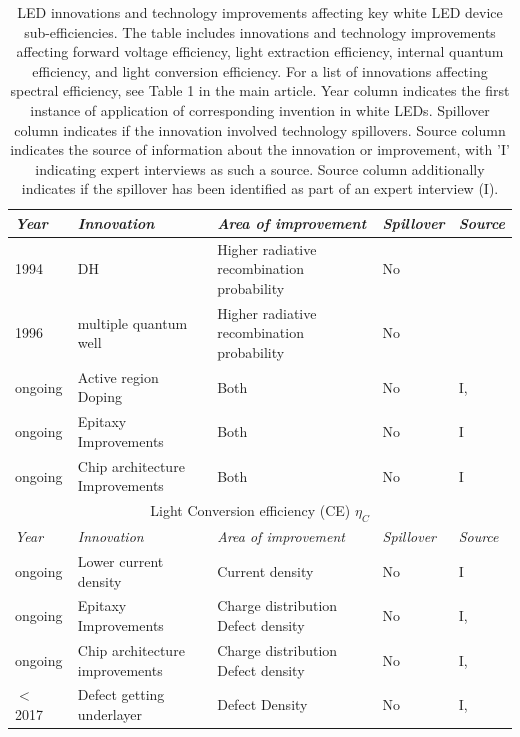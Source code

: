 \documentclass[10pt]{article}
\begin{document}
\begin{table}[H]
\begin{tabularx}{\textwidth}{ |l|X|X|l|l| }
        \hline
            \textit{Year} & \textit{Innovation} & \textit{Area of improvement} & \textit{Spillover} & \textit{Source} \\
        \hline
            1994 & DH & Higher radiative recombination probability & No & \cite{Nakamura1994} \\
        \hline
            1996 & multiple quantum well & Higher radiative recombination probability & No & \cite{Koike1996} \\
        \hline
            ongoing & Active region \newline Doping & Both & No & I, \cite{schubert2018light} \\
        \hline
            ongoing & Epitaxy \newline Improvements & Both & No & I \\
        \hline
            ongoing & Chip architecture \newline Improvements & Both & No & I \\
        \hline
        \multicolumn{5}{c}{Light Conversion efficiency (CE) $\eta_{C}$} \\
        \hline
            \textit{Year} & \textit{Innovation} & \textit{Area of improvement} & \textit{Spillover} & \textit{Source} \\
        \hline
            ongoing & Lower current density & Current density & No & I \\
        \hline
            ongoing & Epitaxy \newline Improvements & Charge distribution \newline Defect density & No & I, \cite{bhardwaj2016progress} \\
        \hline
            ongoing & Chip architecture \newline improvements  & Charge distribution \newline Defect density & No & I, \cite{Wildeson2017} \\
        \hline
            $<$ 2017 & Defect getting \newline underlayer & Defect Density & No & I, \cite{haller2017burying} \\
        \hline
        \end{tabularx}
    \caption{LED innovations and technology improvements affecting key white LED device sub-efficiencies. The table includes innovations and technology improvements affecting forward voltage efficiency, light extraction efficiency, internal quantum efficiency, and light conversion efficiency. For a list of innovations affecting spectral efficiency, see Table 1 in the main article. Year column indicates the first instance of application of corresponding invention in white LEDs. Spillover column indicates if the innovation involved technology spillovers. Source column indicates the source of information about the innovation or improvement, with 'I' indicating expert interviews as such a source. Source column additionally indicates if the spillover has been identified as part of an expert interview (I).}
    \label{tab:innovations}
\end{table}
\end{document}
